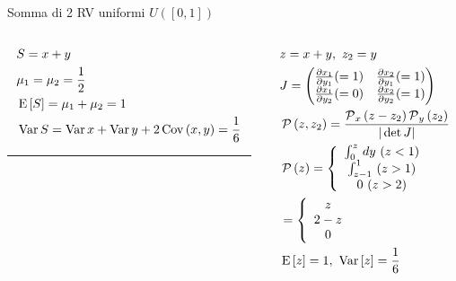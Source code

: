 \documentclass[asd-beamer.tex]{subfiles}%
\begin{document}
\begin{wordonframe}{Somma di 2 RV uniformi $U([0,1])$}
	\begin{columns}[T]
		\begin{column}{0.5\textwidth}
			\begin{align*}
			&S=x+y\\
			&\mu_1=\mu_2=\frac{1}{2}\\
			&\E{[S]}=\mu_1+\mu_2=1\\
			&\var{S}=\var{x}+\var{y}+2\cov{(x,y)}=\frac{1}{6}
			\end{align*}
			\noindent\rule{0.9\textwidth}{0.4pt}
		\end{column}
		\begin{column}{0.5\textwidth}
			\begin{align*}
			&z=x+y,\ z_2=y\\
			&J=\begin{pmatrix}
			\PDy{y_1}{x_1}(=1)&\PDy{y_1}{x_2}(=1)\\
			\PDy{y_2}{x_1}(=0)&\PDy{y_2}{x_2}(=1)\\
			\end{pmatrix}\\
            &\prob{(z,z_2)}=\frac{\prob_x{(z-z_2)}\prob_y{(z_2)}}{|\det{J}|}\\
			&\prob{(z)}=\left\{\begin{array}{c}
			\int_0^z\,dy\ (z<1)\\
			\int_{z-1}^1\ (z>1)\\
			0\ (z>2)\\
			\end{array}\right.\\
			&=\left\{\begin{array}{c}
			z\\
			2-z\\
			0\\
			\end{array}\right.\\
			&\E{[z]}=1,\ \var{[z]}=\frac{1}{6}
			\end{align*}
		\end{column}
	\end{columns}
\end{wordonframe}
\end{document}
